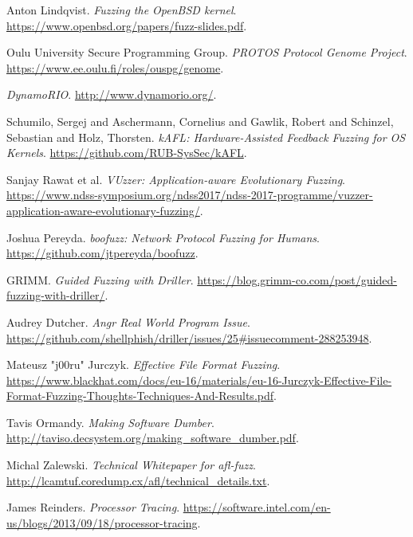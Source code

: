 \begin{thebibliography}{99}
  Anton Lindqvist.
  \textit{Fuzzing the OpenBSD kernel}.
  \url{https://www.openbsd.org/papers/fuzz-slides.pdf}.

  Oulu University Secure Programming Group.
  \textit{PROTOS Protocol Genome Project}.
  \url{https://www.ee.oulu.fi/roles/ouspg/genome}.

  \textit{DynamoRIO}.
  \url{http://www.dynamorio.org/}.

  Schumilo, Sergej and Aschermann, Cornelius and Gawlik, Robert and Schinzel, Sebastian and Holz, Thorsten.
  \textit{kAFL: Hardware-Assisted Feedback Fuzzing for OS Kernels}.
  \url{https://github.com/RUB-SysSec/kAFL}.

  Sanjay Rawat et al.
  \textit{VUzzer: Application-aware Evolutionary Fuzzing}.
  \url{https://www.ndss-symposium.org/ndss2017/ndss-2017-programme/vuzzer-application-aware-evolutionary-fuzzing/}.

  Joshua Pereyda.
  \textit{boofuzz: Network Protocol Fuzzing for Humans}.
  \url{https://github.com/jtpereyda/boofuzz}.

  GRIMM.
  \textit{Guided Fuzzing with Driller}.
  \url{https://blog.grimm-co.com/post/guided-fuzzing-with-driller/}.

  Audrey Dutcher.
  \textit{Angr Real World Program Issue}.
  \url{https://github.com/shellphish/driller/issues/25#issuecomment-288253948}.

  Mateusz "j00ru" Jurczyk.
  \textit{Effective File Format Fuzzing}.
  \url{https://www.blackhat.com/docs/eu-16/materials/eu-16-Jurczyk-Effective-File-Format-Fuzzing-Thoughts-Techniques-And-Results.pdf}.

  Tavis Ormandy.
  \textit{Making Software Dumber}.
  \url{http://taviso.decsystem.org/making_software_dumber.pdf}.

  Michal Zalewski.
  \textit{Technical Whitepaper for afl-fuzz}.
  \url{http://lcamtuf.coredump.cx/afl/technical_details.txt}.

  James Reinders.
  \textit{Processor Tracing}.
  \url{https://software.intel.com/en-us/blogs/2013/09/18/processor-tracing}.


\end{thebibliography}

